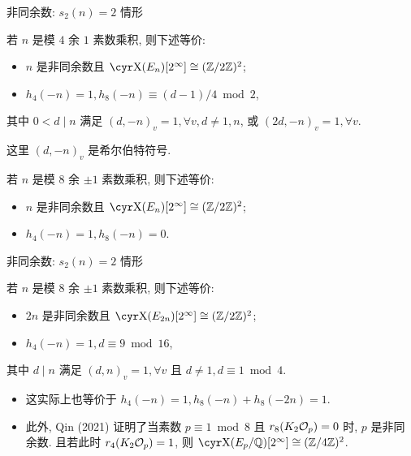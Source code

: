 \documentclass[aspectratio=169]{ctexbeamer}
\begin{document}
\begin{frame}{非同余数: $s_2(n)=2$ 情形}
	\onslide<+->
	\begin{theorem}[nearprev][{Wang 2016}]
		若 $n$ 是模 $4$ 余 $1$ 素数乘积, 则下述等价:
		\begin{itemize}[<*>]
			\item $n$ 是非同余数且 $\Sha(E_n)[2^\infty]\cong(\BZ/2\BZ)^2$;
			\item $h_4(-n)=1,h_8(-n)\equiv (d-1)/4\bmod 2$,
		\end{itemize}
		其中 $0<d\mid n$ 满足 $(d,-n)_v=1,\forall v, d\ne 1,n$, 或 $(2d,-n)_v=1,\forall v$.
	\end{theorem}
	这里 $(d,-n)_v$ 是希尔伯特符号.
	\onslide<+->
	\begin{theorem}
		若 $n$ 是模 $8$ 余 $\pm1$ 素数乘积, 则下述等价:
		\begin{itemize}[<*>]
			\item $n$ 是非同余数且 $\Sha(E_n)[2^\infty]\cong(\BZ/2\BZ)^2$;
			\item $h_4(-n)=1, h_8(-n)=0$.
		\end{itemize}
	\end{theorem}
\end{frame}


\begin{frame}{非同余数: $s_2(n)=2$ 情形}
	\onslide<+->
	\begin{theorem}[][{Zhang 2023}]
		\label{thm:3}
		若 $n$ 是模 $8$ 余 $\pm1$ 素数乘积, 则下述等价:
		\begin{itemize}[<*>]
			\item $2n$ 是非同余数且 $\Sha(E_{2n})[2^\infty]\cong(\BZ/2\BZ)^2$;
			\item $h_4(-n)=1,d\equiv 9\bmod 16$,
		\end{itemize}
		其中 $d\mid n$ 满足 $(d,n)_v=1,\forall v$ 且 $d\ne 1,d\equiv 1\bmod 4$.
	\end{theorem}
	\begin{itemize}
		\item 这实际上也等价于 $h_4(-n)=1,h_8(-n)+h_8(-2n)=1$.
		\item 此外, Qin (2021) 证明了当素数 $p\equiv 1\bmod 8$ 且 $r_8(K_2{\mathcal{O}}_p)=0$ 时, $p$ 是非同余数.
		且若此时 $r_4(K_2{\mathcal{O}}_p)=1$, 则 $\Sha(E_p/\BQ)[2^\infty]\cong(\BZ/4\BZ)^2$.
	\end{itemize}  
\end{frame}
\end{document}
